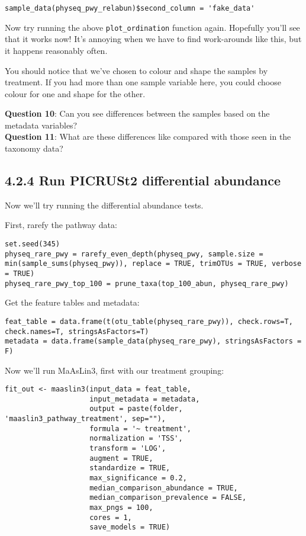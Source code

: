 \documentclass[
]{book}
\begin{document}
\begin{verbatim}
sample_data(physeq_pwy_relabun)$second_column = 'fake_data'
\end{verbatim}

Now try running the above \texttt{plot\_ordination} function again. Hopefully you'll see that it works now! It's annoying when we have to find work-arounds like this, but it happens reasonably often.

You should notice that we've chosen to colour and shape the samples by treatment. If you had more than one sample variable here, you could choose colour for one and shape for the other.

\textbf{Question 10}: Can you see differences between the samples based on the metadata variables?\\
\textbf{Question 11}: What are these differences like compared with those seen in the taxonomy data?

\subsection{4.2.4 Run PICRUSt2 differential abundance}\label{run-picrust2-differential-abundance}

Now we'll try running the differential abundance tests.

First, rarefy the pathway data:

\begin{verbatim}
set.seed(345)
physeq_rare_pwy = rarefy_even_depth(physeq_pwy, sample.size = min(sample_sums(physeq_pwy)), replace = TRUE, trimOTUs = TRUE, verbose = TRUE)
physeq_rare_pwy_top_100 = prune_taxa(top_100_abun, physeq_rare_pwy)
\end{verbatim}

Get the feature tables and metadata:

\begin{verbatim}
feat_table = data.frame(t(otu_table(physeq_rare_pwy)), check.rows=T, check.names=T, stringsAsFactors=T)
metadata = data.frame(sample_data(physeq_rare_pwy), stringsAsFactors = F)
\end{verbatim}

Now we'll run MaAsLin3, first with our treatment grouping:

\begin{verbatim}
fit_out <- maaslin3(input_data = feat_table,
                    input_metadata = metadata,
                    output = paste(folder, 'maaslin3_pathway_treatment', sep=""),
                    formula = '~ treatment',
                    normalization = 'TSS',
                    transform = 'LOG',
                    augment = TRUE,
                    standardize = TRUE,
                    max_significance = 0.2,
                    median_comparison_abundance = TRUE,
                    median_comparison_prevalence = FALSE,
                    max_pngs = 100,
                    cores = 1,
                    save_models = TRUE)
\end{verbatim}
\end{document}
